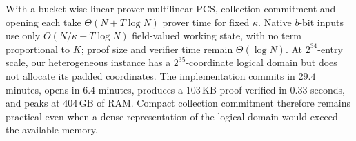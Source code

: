 \documentclass[letterpaper,twocolumn,10pt]{article}
\begin{document}
With a bucket-wise linear-prover multilinear PCS, collection commitment and
opening each take $\Theta(N+T\log N)$ prover time for fixed $\kappa$.  Native
$b$-bit inputs use only $O(N/\kappa+T\log N)$ field-valued working
state, with no term proportional to $K$; proof size and verifier time remain
$\Theta(\log N)$.  At $2^{34}$-entry
scale, our heterogeneous instance has a $2^{35}$-coordinate logical domain but
does not allocate its padded coordinates.  The implementation commits in
$29.4$ minutes, opens in $6.4$ minutes, produces a $103$\,KB proof verified in
$0.33$ seconds, and peaks at $404$\,GB of RAM.  Compact collection commitment
therefore remains practical even when a dense representation of the logical
domain would exceed the available memory.


\cleardoublepage
\appendix




\cleardoublepage


\cleardoublepage


\cleardoublepage



\end{document}
